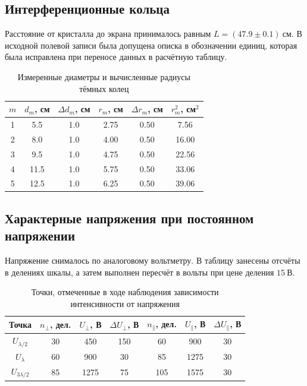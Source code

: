 \documentclass[a4paper,12pt]{article}
\begin{document}
\subsection*{Интерференционные кольца}
Расстояние от кристалла до экрана принималось равным $L=(47.9\pm0.1)~\text{см}$. В исходной полевой записи была допущена описка в обозначении единиц, которая была исправлена при переносе данных в расчётную таблицу.

\begin{table}[H]
\centering
\caption{Измеренные диаметры и вычисленные радиусы тёмных колец}
\begin{tabular}{cccccc}
\toprule
$m$ & $d_m$, см & $\Delta d_m$, см & $r_m$, см & $\Delta r_m$, см & $r_m^2$, см$^2$ \\
\midrule
1 & 5.5 & 1.0 & 2.75 & 0.50 & 7.56 \\
2 & 8.0 & 1.0 & 4.00 & 0.50 & 16.00 \\
3 & 9.5 & 1.0 & 4.75 & 0.50 & 22.56 \\
4 & 11.5 & 1.0 & 5.75 & 0.50 & 33.06 \\
5 & 12.5 & 1.0 & 6.25 & 0.50 & 39.06 \\
\bottomrule
\end{tabular}
\end{table}

\subsection*{Характерные напряжения при постоянном напряжении}
Напряжение снималось по аналоговому вольтметру. В таблицу занесены отсчёты в делениях шкалы, а затем выполнен пересчёт в вольты при цене деления $15~\text{В}$.

\begin{table}[H]
\centering
\caption{Точки, отмеченные в ходе наблюдения зависимости интенсивности от напряжения}
\begin{tabular}{ccccccc}
\toprule
Точка & $n_{\perp}$, дел. & $U_{\perp}$, В & $\Delta U_{\perp}$, В & $n_{\parallel}$, дел. & $U_{\parallel}$, В & $\Delta U_{\parallel}$, В \\
\midrule
$U_{\lambda/2}$ & 30 & 450 & 150 & 60 & 900 & 30 \\
$U_{\lambda}$ & 60 & 900 & 30 & 85 & 1275 & 30 \\
$U_{3\lambda/2}$ & 85 & 1275 & 75 & 105 & 1575 & 30 \\
\bottomrule
\end{tabular}
\end{table}
\end{document}
